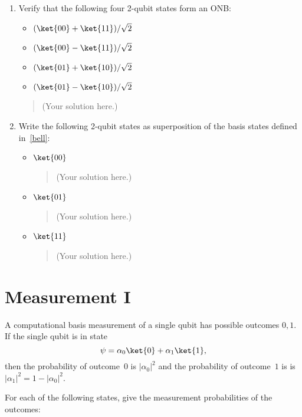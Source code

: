 \documentclass[a4paper,10pt,reqno,nonamelimits]{article}
\begin{document}
\begin{enumerate}[label=(\alph*)]
\item\label{bell} Verify that the following four 2-qubit states form an ONB:
  \begin{itemize}
  \item $( \ket{00}+\ket{11} )/\sqrt2$
  \item $( \ket{00}-\ket{11} )/\sqrt2$
  \item $( \ket{01}+\ket{10} )/\sqrt2$
  \item $( \ket{01}-\ket{10} )/\sqrt2$
  \end{itemize}

    \begin{quotation}\color{blue}
      (Your solution here.)
    \end{quotation}

  \item Write the following 2-qubit states as superposition of the basis states defined in~\ref{bell}:
  \begin{itemize}
  \item $\ket{00}$
    \begin{quotation}\color{blue}
      (Your solution here.)
    \end{quotation}
  \item $\ket{01}$
    \begin{quotation}\color{blue}
      (Your solution here.)
    \end{quotation}
  \item $\ket{11}$
    \begin{quotation}\color{blue}
      (Your solution here.)
    \end{quotation}
  \end{itemize}
\end{enumerate}

\section{Measurement I}

A computational basis measurement of a single qubit has possible outcomes $0,1$.  If the single qubit is in state
\begin{equation*}
  \psi = \alpha_0\ket{0} + \alpha_1 \ket{1},
\end{equation*}
then the probability of outcome~$0$ is $|\alpha_0|^2$ and the probability of outcome~$1$ is is
$|\alpha_1|^2 = 1 - |\alpha_0|^2$.

For each of the following states, give the measurement probabilities of the outcomes:
\end{document}
